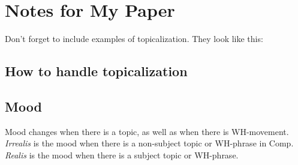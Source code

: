 \documentclass[12pt]{article}
\begin{document}
\section*{Notes for My Paper}

Don't forget to include examples of topicalization.
They look like this:

\subsection*{How to handle topicalization}

\subsection*{Mood}

Mood changes when there is a topic, as well as when
there is WH-movement.  \emph{Irrealis} is the mood when
there is a non-subject topic or WH-phrase in Comp.
\emph{Realis} is the mood when there is a subject topic
or WH-phrase.
\end{document}
